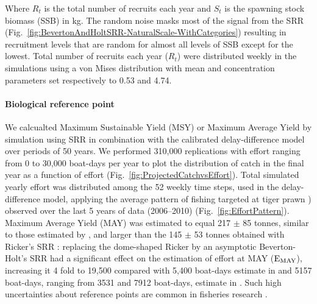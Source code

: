 \noindent Where $R_{t}$ is the total number of recruits each year and $S_{t}$ is the spawning stock biomass (SSB) in kg. The random noise masks most of the signal from the SRR (Fig.~\ref{fig:BevertonAndHoltSRR-NaturalScale-WithCategories}) resulting in recruitment levels that are random for almost all levels of SSB except for the lowest. Total number of recruits each year ($R_{t}$) were distributed weekly in the simulations using a von Mises distribution \citep{mardia1999directional} with mean and concentration parameters set respectively to 0.53 and 4.74.

\paragraph{Biological reference point} We calcualted Maximum Sustainable Yield (MSY) or Maximum Average Yield \citep{Mace2000MSYa} by simulation using SRR in combination with the calibrated delay-difference model over periods of 50 years. We performed 310,000 replications with effort ranging from 0 to 30,000 boat-days per year to plot the distribution of catch in the final year as a function of effort (Fig.~\ref{fig:ProjectedCatchvsEffort}). Total simulated yearly effort was distributed among the 52 weekly time steps, used in the delay-difference model, applying the average pattern of fishing targeted at tiger prawn \citep{Kienzle2014138}) observed over the last 5 years of data (2006--2010) (Fig.~\ref{fig:EffortPattern}). Maximum Average Yield (MAY) was estimated to equal 217 $\pm$ 85 tonnes, similar to those estimated by \cite{NaWang2015a}, and larger than the 145 $\pm$ 53 tonnes obtained with Ricker's SRR \citep{Kienzle2014138}: replacing the dome-shaped Ricker by an asymptotic Beverton-Holt's SRR had a significant effect on the estimation of effort at MAY ($\rm{E_{MAY}}$), increasing it 4 fold to 19,500 compared with 5,400 boat-days estimate in \cite{Kienzle2014138} and 5157 boat-days, ranging from 3531 and 7912 boat-days, estimate in \cite{NaWang2015a}. Such high uncertainties about reference points are common in fisheries research \citep{hil92b}.

